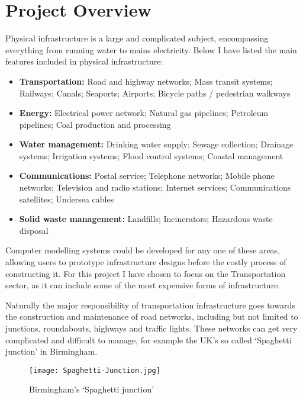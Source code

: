 \section{Project Overview}

    Physical infrastructure is a large and complicated subject, encompassing everything from running water to mains electricity. Below I have listed the main features included in physical infrastructure:

    \begin{itemize}
        \item \textbf{Transportation:} Road and highway networks; Mass transit systems; Railways; Canals; Seaports; Airports; Bicycle paths / pedestrian walkways

        \item \textbf{Energy:} Electrical power network; Natural gas pipelines; Petroleum pipelines; Coal production and processing

        \item \textbf{Water management:} Drinking water supply; Sewage collection; Drainage systems; Irrigation systems; Flood control systems; Coastal management

        \item \textbf{Communications:} Postal service; Telephone networks; Mobile phone networks; Television and radio stations; Internet services; Communications satellites; Undersea cables

        \item \textbf{Solid waste management:} Landfills; Incinerators; Hazardous waste disposal
    \end{itemize}

    Computer modelling systems could be developed for any one of these areas, allowing users to prototype infrastructure designs before the costly process of constructing it. For this project I have chosen to focus on the Transportation sector, as it can include some of the most expensive forms of infrastructure.

    Naturally the major responsibility of transportation infrastructure goes towards the construction and maintenance of road networks, including but not limited to junctions, roundabouts, highways and traffic lights.
    These networks can get very complicated and difficult to manage, for example the UK's so called `Spaghetti junction' in Birmingham.

    \begin{figure}[ht]
        \texttt{[image: Spaghetti-Junction.jpg]}
        \centering
        \caption{Birmingham's `Spaghetti junction'~\cite{Spaghetti-Junction}}
    \end{figure}

